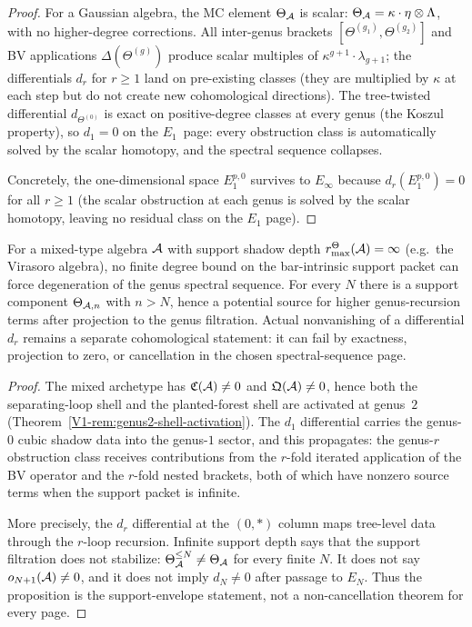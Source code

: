 \begin{proof}
For a Gaussian algebra, the MC element $\Theta_{\mathcal{A}}$ is
scalar: $\Theta_{\mathcal{A}} = \kappa \cdot \eta \otimes \Lambda$,
with no higher-degree corrections. All inter-genus
brackets $[\Theta^{(g_1)},\Theta^{(g_2)}]$ and BV applications
$\Delta(\Theta^{(g)})$ produce scalar multiples of
$\kappa^{g+1} \cdot \lambda_{g+1}$; the differentials $d_r$
for $r \geq 1$ land on pre-existing classes (they are
multiplied by $\kappa$ at each step but do not create new
cohomological directions). The tree-twisted differential
$d_{\Theta^{(0)}}$ is exact on positive-degree classes at
every genus (the Koszul property), so $d_1 = 0$ on the
$E_1$~page: every obstruction class is automatically solved
by the scalar homotopy, and the spectral sequence collapses.

Concretely, the one-dimensional space $E_1^{p,0}$ survives
to $E_\infty$ because $d_r(E_1^{p,0}) = 0$ for all $r \geq 1$
(the scalar obstruction at each genus is solved by the scalar
homotopy, leaving no residual class on the $E_1$ page).
\end{proof}

\begin{proposition}
\label{prop:thqg-VII-mixed-nondegeneration}
For a mixed-type algebra $\mathcal{A}$ with support shadow depth
\(r^\Theta_{\max}(\mathcal{A})=\infty\)
\textup{(}e.g.\ the Virasoro algebra\textup{)}, no finite degree
bound on the bar-intrinsic support packet can force degeneration of
the genus spectral sequence. For every \(N\) there is a support
component \(\Theta_{\mathcal{A},n}\) with \(n>N\), hence a potential source for
higher genus-recursion terms after projection to the genus filtration.
Actual nonvanishing of a differential \(d_r\) remains a separate
cohomological statement: it can fail by exactness, projection to zero,
or cancellation in the chosen spectral-sequence page.
\end{proposition}

\begin{proof}
The mixed archetype has $\mathfrak{C}(\mathcal{A}) \neq 0$ and
$\mathfrak{Q}(\mathcal{A}) \neq 0$, hence both the separating-loop
shell and the planted-forest shell are activated at genus~$2$
(Theorem~\ref{V1-rem:genus2-shell-activation}). The $d_1$
differential carries the genus-$0$ cubic shadow data into the
genus-$1$ sector, and this propagates: the genus-$r$
obstruction class receives contributions from the
$r$-fold iterated application of the BV operator and the
$r$-fold nested brackets, both of which have nonzero source terms when
the support packet is infinite.

More precisely, the \(d_r\) differential at the \((0,*)\) column maps
tree-level data through the \(r\)-loop recursion. Infinite support
depth says that the support filtration does not stabilize:
\(\Theta_{\mathcal{A}}^{\leq N}\neq \Theta_{\mathcal{A}}\) for every finite \(N\).
It does not say \(o_{N+1}(\mathcal{A})\neq0\), and it does not imply
\(d_N\neq0\) after passage to \(E_N\). Thus the proposition is the
support-envelope statement, not a non-cancellation theorem for every
page.
\end{proof}

